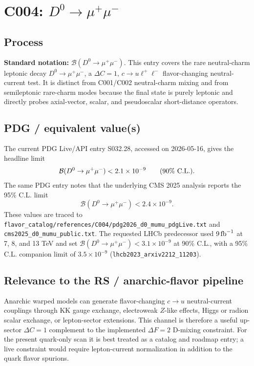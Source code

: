 
\section{C004: \(D^0\to\mu^+\mu^-\)}

\subsection*{Process}
\textbf{Standard notation:} \(\mathcal{B}(D^0\to\mu^+\mu^-)\).
This entry covers the rare neutral-charm leptonic decay
\(D^0\to\mu^+\mu^-\), a \(\Delta C=1\), \(c\to u\ell^+\ell^-\)
flavor-changing neutral-current test.  It is distinct from C001/C002
neutral-charm mixing and from semileptonic rare-charm modes because the final
state is purely leptonic and directly probes axial-vector, scalar, and
pseudoscalar short-distance operators.

\subsection*{PDG / equivalent value(s)}
The current PDG Live/API entry S032.28, accessed on 2026-05-16, gives the
headline limit
\[
  \mathcal{B}(D^0\to\mu^+\mu^-) < 2.1\times10^{-9}
  \qquad (90\%~{\rm C.L.}).
\]
The same PDG entry notes that the underlying CMS 2025 analysis reports the
95\% C.L. limit
\[
  \mathcal{B}(D^0\to\mu^+\mu^-) < 2.4\times10^{-9}.
\]
These values are traced to
\texttt{flavor\_catalog/references/C004/pdg2026\_d0\_mumu\_pdgLive.txt}
and \texttt{cms2025\_d0\_mumu\_public.txt}.  The requested LHCb predecessor
used \(9\,{\rm fb}^{-1}\) at 7, 8, and 13 TeV and set
\(\mathcal{B}(D^0\to\mu^+\mu^-)<3.1\times10^{-9}\) at 90\% C.L.,
with a 95\% C.L. companion limit of \(3.5\times10^{-9}\)
(\texttt{lhcb2023\_arxiv2212\_11203}).

\subsection*{Relevance to the RS / anarchic-flavor pipeline}
Anarchic warped models can generate flavor-changing \(c\to u\) neutral-current
couplings through KK gauge exchange, electroweak \(Z\)-like effects, Higgs or
radion scalar exchange, or lepton-sector extensions.  This channel is therefore
a useful up-sector \(\Delta C=1\) complement to the implemented \(\Delta F=2\)
D-mixing constraint.  For the present quark-only scan it is best treated as a
catalog and roadmap entry; a live constraint would require lepton-current
normalization in addition to the quark flavor spurions.

